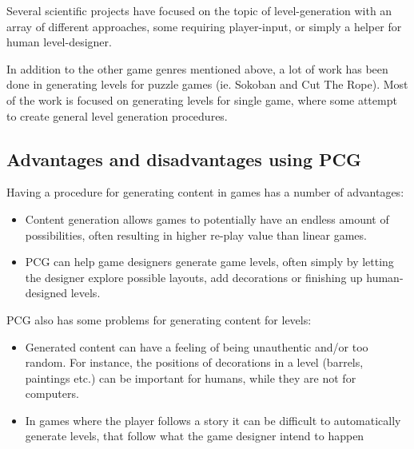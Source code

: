 \documentclass[a4paper,titlepage,final]{report}
\begin{document}
Several scientific projects have focused on the topic of level-generation with an array of different approaches, some requiring player-input, or simply a helper for human level-designer.

In addition to the other game genres mentioned above, a lot of work has been done in generating levels for puzzle games (ie. Sokoban and Cut The Rope).
Most of the work is focused on generating levels for single game, where some attempt to create general level generation procedures.




\subsection{Advantages and disadvantages using PCG}

Having a procedure for generating content in games has a number of advantages:

\begin{itemize}
  \item Content generation allows games to potentially have an endless amount of possibilities, often resulting in higher re-play value than linear games. 
  \item PCG can help game designers generate game levels, often simply by letting the designer explore possible layouts, add decorations or finishing up human-designed levels.
\end{itemize}

PCG also has some problems for generating content for levels:

\begin{itemize}
  \item Generated content can have a feeling of being unauthentic and/or too random. For instance, the positions of decorations in a level (barrels, paintings etc.) can be important for humans, while they are not for computers.
  \item In games where the player follows a story it can be difficult to automatically generate levels, that follow what the game designer intend to happen%
\end{itemize}
\end{document}
